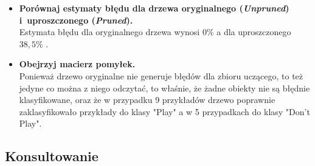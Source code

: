 \begin{itemize}
\item \textbf{Porównaj estymaty błędu dla drzewa oryginalnego (\emph{Unpruned}) i~uproszczonego (\emph{Pruned}).}
	\\Estymata błędu dla oryginalnego drzewa wynosi  $ 0\% $ a dla uproszczonego $ 38,5\% $ .

\item \textbf{Obejrzyj macierz pomyłek.}
	\\Ponieważ drzewo oryginalne nie generuje błędów dla zbioru uczącego, to też jedyne co można z niego odczytać, to właśnie, że żadne obiekty nie są błędnie klasyfikowane, oraz że w przypadku 9 przykładów drzewo poprawnie zaklasyfikowało przykłady do klasy "Play" a w 5 przypadkach do klasy "Don't Play".

\end{itemize}

\subsection{Konsultowanie}

